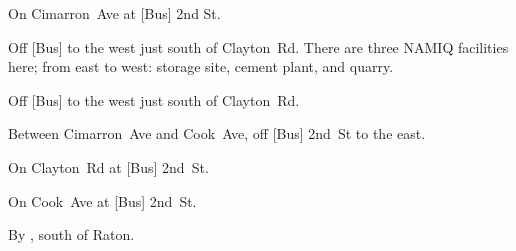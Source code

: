 
\begin{LocationList}

On Cimarron~Ave at [Bus] 2nd St.

Off [Bus] to the west just south of  Clayton~Rd.
There are three NAMIQ facilities here; from east to west: storage site, cement plant, and quarry.

Off [Bus] to the west just south of  Clayton~Rd.

Between Cimarron~Ave and Cook~Ave, off [Bus] 2nd~St to the east.

On  Clayton~Rd at [Bus] 2nd~St.

\Location{\TruckService \Service}
On Cook~Ave at [Bus] 2nd~St.

\Location{\TruckStop \Gas \Rest \Weigh}
By  , south of Raton.

\end{LocationList}
